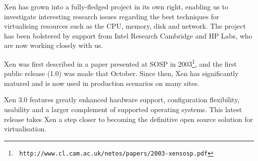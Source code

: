 Xen has grown into a fully-fledged project in its own right, enabling
us to investigate interesting research issues regarding the best
techniques for virtualising resources such as the CPU, memory, disk
and network.  The project has been bolstered by support from Intel
Research Cambridge and HP Labs, who are now working closely with us.

Xen was first described in a paper presented at SOSP in
2003\footnote{\tt
  http://www.cl.cam.ac.uk/netos/papers/2003-xensosp.pdf}, and the
first public release (1.0) was made that October.  Since then, Xen has
significantly matured and is now used in production scenarios on many
sites.

Xen 3.0 features greatly enhanced hardware support, configuration
flexibility, usability and a larger complement of supported operating
systems. This latest release takes Xen a step closer to becoming the
definitive open source solution for virtualisation.
